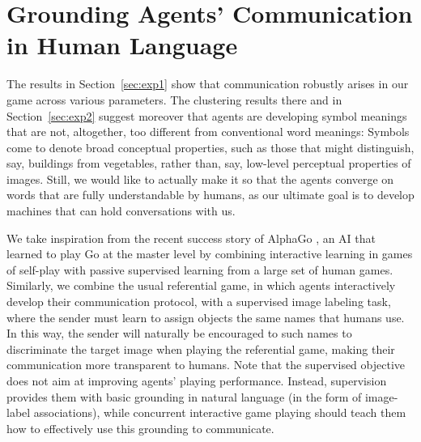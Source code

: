 \section{Grounding Agents' Communication in Human Language}
The results in Section~\ref{sec:exp1} show that communication robustly
arises in our game across various parameters.  The clustering results
there and in Section~\ref{sec:exp2} suggest moreover that agents are
developing symbol meanings that are not, altogether, too different
from conventional word meanings: Symbols come to
denote broad conceptual properties, such as those that might
distinguish, say, buildings from vegetables, rather than, say,
low-level perceptual properties of images. Still, we would like to
actually make it so that the agents converge on words that
are fully understandable by humans, as our ultimate goal is to develop
machines that can hold conversations with us. %

We take inspiration from the recent success story of AlphaGo
\cite{Silver:etal:2016}, an AI that learned to play Go at the master
level by combining interactive learning in games of self-play with
passive supervised learning from a large set of human
games. Similarly, we combine the usual referential game, in which
agents interactively develop their communication protocol, with a
supervised image labeling task, where the sender must learn to assign
objects the same names that humans use. In this way, the sender will
naturally be encouraged to such names to discriminate the
target image when playing the referential game, making their
communication more transparent to humans. %
Note that the supervised objective does not aim at improving agents'
playing performance. Instead, supervision provides them with basic
grounding in natural language (in the form of image-label
associations), while concurrent interactive game playing should teach
them how to effectively use this grounding to communicate.

